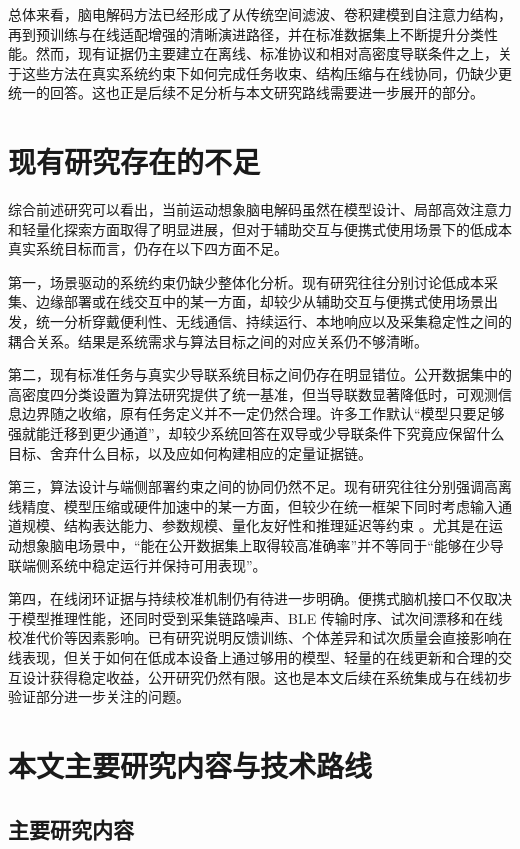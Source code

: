 总体来看，脑电解码方法已经形成了从传统空间滤波、卷积建模到自注意力结构，再到预训练与在线适配增强的清晰演进路径，并在标准数据集上不断提升分类性能。然而，现有证据仍主要建立在离线、标准协议和相对高密度导联条件之上，关于这些方法在真实系统约束下如何完成任务收束、结构压缩与在线协同，仍缺少更统一的回答。这也正是后续不足分析与本文研究路线需要进一步展开的部分。

\section{现有研究存在的不足}

综合前述研究可以看出，当前运动想象脑电解码虽然在模型设计、局部高效注意力和轻量化探索方面取得了明显进展，但对于辅助交互与便携式使用场景下的低成本真实系统目标而言，仍存在以下四方面不足。

第一，场景驱动的系统约束仍缺少整体化分析。现有研究往往分别讨论低成本采集、边缘部署或在线交互中的某一方面，却较少从辅助交互与便携式使用场景出发，统一分析穿戴便利性、无线通信、持续运行、本地响应以及采集稳定性之间的耦合关系。结果是系统需求与算法目标之间的对应关系仍不够清晰。

第二，现有标准任务与真实少导联系统目标之间仍存在明显错位。公开数据集中的高密度四分类设置为算法研究提供了统一基准，但当导联数显著降低时，可观测信息边界随之收缩，原有任务定义并不一定仍然合理。许多工作默认“模型只要足够强就能迁移到更少通道”，却较少系统回答在双导或少导联条件下究竟应保留什么目标、舍弃什么目标，以及应如何构建相应的定量证据链。

第三，算法设计与端侧部署约束之间的协同仍然不足。现有研究往往分别强调高离线精度、模型压缩或硬件加速中的某一方面，但较少在统一框架下同时考虑输入通道规模、结构表达能力、参数规模、量化友好性和推理延迟等约束 \cite{keu2024compact, wan2023novel, hua2023improved}。尤其是在运动想象脑电场景中，“能在公开数据集上取得较高准确率”并不等同于“能够在少导联端侧系统中稳定运行并保持可用表现”。

第四，在线闭环证据与持续校准机制仍有待进一步明确。便携式脑机接口不仅取决于模型推理性能，还同时受到采集链路噪声、BLE 传输时序、试次间漂移和在线校准代价等因素影响。已有研究说明反馈训练、个体差异和试次质量会直接影响在线表现，但关于如何在低成本设备上通过够用的模型、轻量的在线更新和合理的交互设计获得稳定收益，公开研究仍然有限。这也是本文后续在系统集成与在线初步验证部分进一步关注的问题。

\section{本文主要研究内容与技术路线}
\subsection{主要研究内容}

